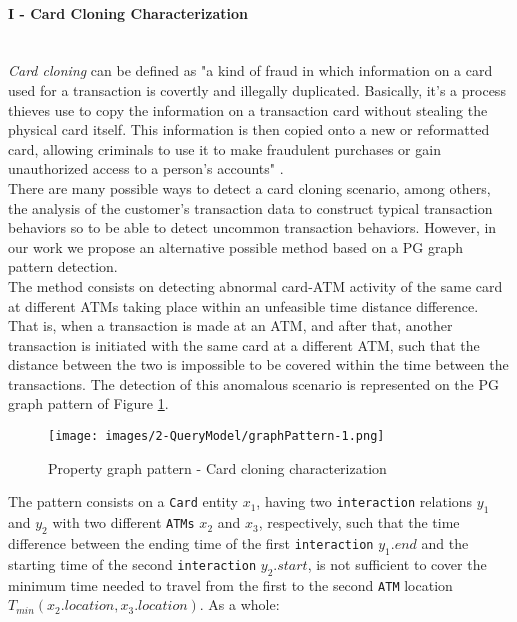 \paragraph{I - Card Cloning Characterization\\\\}

\emph{Card cloning} can be defined as "a kind of fraud in which information on a card used for a transaction is covertly and illegally duplicated. 
Basically, it’s a process thieves use to copy the information on a transaction card without stealing the physical card itself. 
This information is then copied onto a new or reformatted card, allowing criminals to use it to make fraudulent purchases or gain unauthorized access to a person’s accounts" \cite{FP-unit21_card_cloning}.\\

There are many possible ways to detect a card cloning scenario, among others, the analysis of the customer's transaction data to construct typical transaction behaviors so to be able to detect uncommon transaction behaviors. However, in our work we propose an alternative possible method based on a PG graph pattern detection.\\

The method consists on detecting abnormal card-ATM activity of the same card at different ATMs taking place within an unfeasible time distance difference. That is, when a transaction is made at an ATM, and after that, another transaction is initiated with the same card at a different ATM, such that the distance between the two is impossible to be covered within the time between the transactions.
The detection of this anomalous scenario is represented on the PG graph pattern of Figure \ref{img:graphPattern-1}. 

\begin{figure}[H]
  \centering
  \texttt{[image: images/2-QueryModel/graphPattern-1.png]}
  \caption{Property graph pattern - Card cloning characterization}
  \label{img:graphPattern-1}
\end{figure}

The pattern consists on a \texttt{Card} entity $x_1$, having two \texttt{interaction} relations $y_1$ and $y_2$ with two different \texttt{ATMs} $x_2$ and $x_3$, respectively, such that the time difference between the ending time of the first \texttt{interaction} $y_1.\textit{end}$ and the starting time of the second \texttt{interaction} $y_2.\textit{start}$, is not sufficient to cover the minimum time needed to travel from the first to the second \texttt{ATM} location $T_{min}(x_2.\textit{location}, x_3.\textit{location})$. As a whole:


